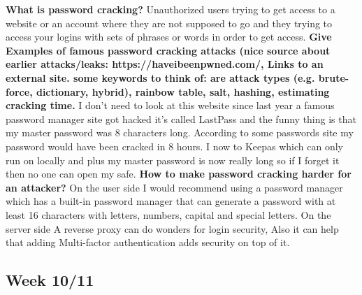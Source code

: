 \documentclass[12pt, letterpaper]{article}
\begin{document}
\hfill\break
\hfill\break
\textbf{What is password cracking?}
\hfill\break
Unauthorized users trying to get access to a website or an account where they are not supposed to go and they trying to access your logins with sets of phrases or words in order to get access.
\hfill\break
\hfill\break
\textbf{Give Examples of famous password cracking attacks (nice source about earlier attacks/leaks: https://haveibeenpwned.com/, Links to an external site. some keywords to think of: are attack types (e.g. brute-force, dictionary, hybrid), rainbow table, salt, hashing, estimating cracking time.}
\hfill\break
I don't need to look at this website since last year a famous password manager site got hacked it's called LastPass and the funny thing is that my master password was 8 characters long. According to some passwords site my password would have been cracked in 8 hours. I now to Keepas which can only run on locally and plus my master password is now really long so if I forget it then no one can open my safe.
\hfill\break
\hfill\break
\textbf{How to make password cracking harder for an attacker?}
\hfill\break
On the user side
\hfill\break
I would recommend using a password manager which has a built-in password manager that can generate a password with at least 16 characters with letters, numbers, capital and special letters.
\hfill\break
\hfill\break
On the server side
\hfill\break
A reverse proxy can do wonders for login security, Also it can help that adding Multi-factor authentication adds security on top of it.
\newpage
\subsection{Week 10/11}
\end{document}
